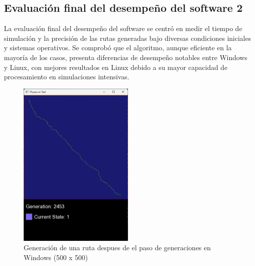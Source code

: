 \subsection{Evaluaci\'on final del desempe\~no del software 2}
    La evaluaci\'on final del desempe\~no del software se centr\'o en
        medir el tiempo de simulaci\'on y la precisi\'on de las rutas
        generadas bajo diversas condiciones iniciales y sistemas
        operativos. Se comprob\'o que el algoritmo, aunque eficiente
        en la mayor\'ia de los casos, presenta diferencias de
        desempe\~no notables entre Windows y Linux, con mejores
        resultados en Linux debido a su mayor capacidad de
        procesamiento en simulaciones intensivas.
    \vskip 0.5cm
    \begin{figure}[htbp]
        \centering
        \includegraphics[width=0.5\textwidth]{./images/Pruebas/simulador/image085.png}
        \caption{Generaci\'on de una ruta despues de el paso de generaciones en Windows (500 x 500)}
        \label{fig:Ruta 85}
    \end{figure}
    \vskip 0.5cm

